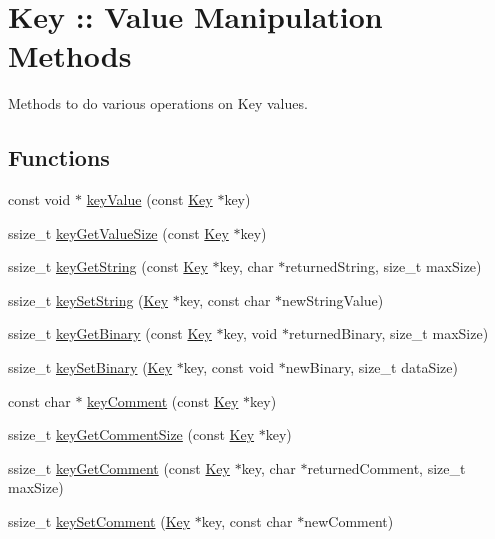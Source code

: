 \hypertarget{group__keyvalue}{
\section{Key :: Value Manipulation Methods}
\label{group__keyvalue}
}


Methods to do various operations on Key values.  


\subsection*{Functions}
\begin{DoxyCompactItemize}
\item 
const void $\ast$ \hyperlink{group__keyvalue_ga6f29609c5da53c6dc26a98678d5752af}{keyValue} (const \hyperlink{struct__Key}{Key} $\ast$key)
\item 
ssize\_\-t \hyperlink{group__keyvalue_gae326672fffb7474abfe9baf53b73217e}{keyGetValueSize} (const \hyperlink{struct__Key}{Key} $\ast$key)
\item 
ssize\_\-t \hyperlink{group__keyvalue_ga41b9fac5ccddafe407fc0ae1e2eb8778}{keyGetString} (const \hyperlink{struct__Key}{Key} $\ast$key, char $\ast$returnedString, size\_\-t maxSize)
\item 
ssize\_\-t \hyperlink{group__keyvalue_ga622bde1eb0e0c4994728331326340ef2}{keySetString} (\hyperlink{struct__Key}{Key} $\ast$key, const char $\ast$newStringValue)
\item 
ssize\_\-t \hyperlink{group__keyvalue_ga4c0d8a4a11174197699c231e0b5c3c84}{keyGetBinary} (const \hyperlink{struct__Key}{Key} $\ast$key, void $\ast$returnedBinary, size\_\-t maxSize)
\item 
ssize\_\-t \hyperlink{group__keyvalue_gaa50a5358fd328d373a45f395fa1b99e7}{keySetBinary} (\hyperlink{struct__Key}{Key} $\ast$key, const void $\ast$newBinary, size\_\-t dataSize)
\item 
const char $\ast$ \hyperlink{group__keyvalue_gac89fd319783b3457db45b4c09e55274a}{keyComment} (const \hyperlink{struct__Key}{Key} $\ast$key)
\item 
ssize\_\-t \hyperlink{group__keyvalue_ga0dd737fadc16d4cf16720d17f066a9d3}{keyGetCommentSize} (const \hyperlink{struct__Key}{Key} $\ast$key)
\item 
ssize\_\-t \hyperlink{group__keyvalue_gafb89735689929ff717cc9f2d0d0b46a2}{keyGetComment} (const \hyperlink{struct__Key}{Key} $\ast$key, char $\ast$returnedComment, size\_\-t maxSize)
\item 
ssize\_\-t \hyperlink{group__keyvalue_ga8863a877a84fa46e6017fe72e49b89c1}{keySetComment} (\hyperlink{struct__Key}{Key} $\ast$key, const char $\ast$newComment)
\end{DoxyCompactItemize}


